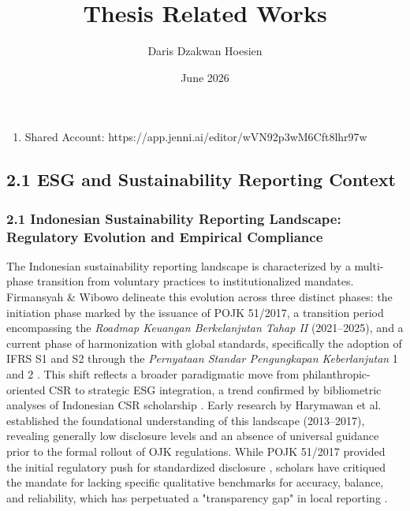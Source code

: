 \documentclass{article}
\title{Thesis Related Works}
\author{Daris Dzakwan Hoesien}
\date{June 2026}
\begin{document}
\maketitle
\begin{enumerate}
\item 

Shared Account: https://app.jenni.ai/editor/wVN92p3wM6Cft8lhr97w
\end{enumerate}
\subsection{2.1 ESG and Sustainability Reporting Context}
\subsubsection{2.1 Indonesian Sustainability Reporting Landscape: Regulatory Evolution and Empirical Compliance}

The Indonesian sustainability reporting landscape is characterized by a multi-phase transition from voluntary practices to institutionalized mandates. Firmansyah \& Wibowo  \parencite{amrie_firmansyah_200ee100} delineate this evolution across three distinct phases: the initiation phase marked by the issuance of POJK 51/2017, a transition period encompassing the \textit{Roadmap Keuangan Berkelanjutan Tahap II} (2021–2025), and a current phase of harmonization with global standards, specifically the adoption of IFRS S1 and S2 through the \textit{Pernyataan Standar Pengungkapan Keberlanjutan} 1 and 2  \parencite{amrie_firmansyah_200ee100}. This shift reflects a broader paradigmatic move from philanthropic-oriented CSR to strategic ESG integration, a trend confirmed by bibliometric analyses of Indonesian CSR scholarship  \parencite{boubacar_demba_barry_a607dad2}. Early research by Harymawan et al.  \parencite{iman_harymawan_2ef898fe} established the foundational understanding of this landscape (2013–2017), revealing generally low disclosure levels and an absence of universal guidance prior to the formal rollout of OJK regulations. While POJK 51/2017 provided the initial regulatory push for standardized disclosure  \parencite[]{alfonsa_roselina_purnomo_d67da232, kuat_waluyo_jati_45c636dc}, scholars have critiqued the mandate for lacking specific qualitative benchmarks for accuracy, balance, and reliability, which has perpetuated a "transparency gap" in local reporting  \parencite{atika_atika_588ee68a}.
\end{document}
